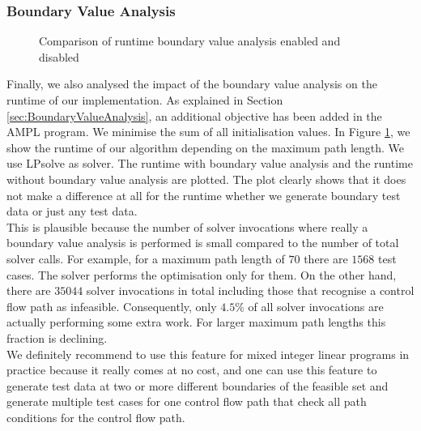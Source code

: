 \documentclass[runningheads,a4paper]{llncs}%
\begin{document}
\subsubsection{Boundary Value Analysis}
\label{sec:caseStudyBoundaryValues}
\begin{figure}
\begin{center}
%
\end{center}%
\caption{Comparison of runtime boundary value analysis enabled and disabled}%
\label{fig:RuntimeBoundaryValue}%
\end{figure}%
Finally, we also analysed the impact of the boundary value analysis on the runtime of our implementation. As explained in Section \ref{sec:BoundaryValueAnalysis}, an additional objective has been added in the AMPL program. We minimise the sum of all initialisation values. In Figure \ref{fig:RuntimeBoundaryValue}, we show the runtime of our algorithm depending on the maximum path length. We use LPsolve as solver. The runtime with boundary value analysis and the runtime without boundary value analysis are plotted. The plot clearly shows that it does not make a difference at all for the runtime whether we generate boundary test data or just any test data.\\%
This is plausible because the number of solver invocations where really a boundary value analysis is performed is small compared to the number of total solver calls. For example, for a maximum path length of $70$ there are $1568$ test cases. The solver performs the optimisation only for them. On the other hand, there are $35044$ solver invocations in total including those that recognise a control flow path as infeasible. Consequently, only $4.5\%$ of all solver invocations are actually performing some extra work. For larger maximum path lengths this fraction is declining.\\%
We definitely recommend to use this feature for mixed integer linear programs in practice because it really comes at no cost, and one can use this feature to generate test data at two or more different boundaries of the feasible set and generate multiple test cases for one control flow path that check all path conditions for the control flow path.%
\end{document}
